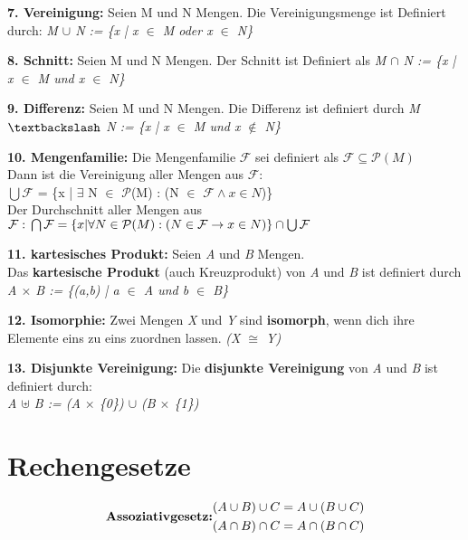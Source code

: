 \textbf{7. Vereinigung:} Seien M und N Mengen. Die Vereinigungsmenge ist Definiert durch: \textit{M $\cup$ N := \{x | x $\in$ M oder x $\in$ N\}}

\textbf{8. Schnitt:} Seien M und N Mengen. Der Schnitt ist Definiert als \textit{M $\cap$ N := \{x | x $\in$ M und x $\in$ N\}}

\textbf{9. Differenz:} Seien M und N Mengen. Die Differenz ist definiert durch \textit{M$\textbackslash$ N := \{x | x $\in$ M und x $\notin$ N\}}

\textbf{10. Mengenfamilie:} Die Mengenfamilie $\mathcal{F}$ sei definiert als $\mathcal{F} \subseteq \mathcal{P}(M)$\\
Dann ist die Vereinigung aller Mengen aus $\mathcal{F}$:\\
$\bigcup\mathcal{F}$ = \{x | $\exists$ N $\in$ $\mathcal{P}$(M) : (N $\in$ $\mathcal{F} \wedge x \in N$)\}\\
Der Durchschnitt aller Mengen aus $\mathcal{F}:\\ \bigcap \mathcal{F} = \{x | \forall N \in \mathcal{P}(M) : (N \in \mathcal{F} \rightarrow x \in N)\} \cap \bigcup \mathcal{F}$ 

\textbf{11. kartesisches Produkt:} Seien \textit{A} und \textit{B} Mengen.\\
Das \textbf{kartesische Produkt} (auch Kreuzprodukt) von \textit{A} und \textit{B} ist definiert durch\\
\textit{A $\times$ B := \{(a,b) | a $\in$ A und b $\in$ B\}}

\textbf{12. Isomorphie:} Zwei Mengen \textit{X} und \textit{Y} sind \textbf{isomorph}, wenn dich ihre Elemente eins zu eins zuordnen lassen. \textit{(X $\cong$ Y)}

\textbf{13. Disjunkte Vereinigung:} Die \textbf{disjunkte Vereinigung} von \textit{A} und \textit{B} ist definiert durch:\\
\textit{A $\uplus$ B := (A $\times$ \{0\}) $\cup$ (B $\times$ \{1\})}



\vspace{3cm}
  
\section*{Rechengesetze}
\begin{equation}
\textbf{Assoziativgesetz:}
\begin{aligned}
(A \cup B) \cup C = A \cup (B \cup C) \\
(A \cap B) \cap C = A \cap (B \cap C) \notag
\end{aligned}
\end{equation}

